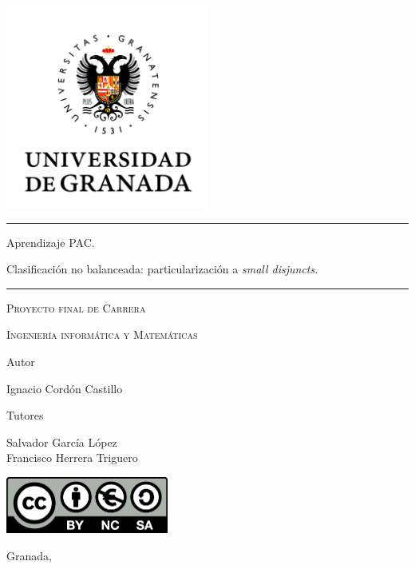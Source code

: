 \newcommand{\myName}{Ignacio Cordón Castillo}
\newcommand{\myTutor}{Salvador García López}
\newcommand{\myOtherTutor}{Francisco Herrera Triguero}
\newcommand{\myUni}{Universidad de Granada}
\newcommand{\myTitle}{Aprendizaje PAC. Clasificación no balanceada: particularización a \textit{small disjuncts}}

\begin{titlepage}
 \centering
 \includegraphics[width=0.5\textwidth]{./imgs/ugr.png}\par
 \rule{\textwidth}{0.3em}\hfill
 {\huge 
   Aprendizaje PAC. \par
   Clasificación no balanceada:
   particularización a \textit{small disjuncts}.\par}
 \rule{\textwidth}{0.3em}\hfill
 \vspace{1cm}
 {\scshape Proyecto final de Carrera\par}
 {\scshape Ingeniería informática y Matemáticas\par}
 \vfill
 {Autor \par}
   {\myName \par}
 {Tutores \par}
   {\myTutor \\
    \myOtherTutor \par}
 \vfill
 \includegraphics[width=0.4\textwidth]{./imgs/by-nc-sa.png}\par
 {Granada, \large \datemmyyyy \par}
\end{titlepage}